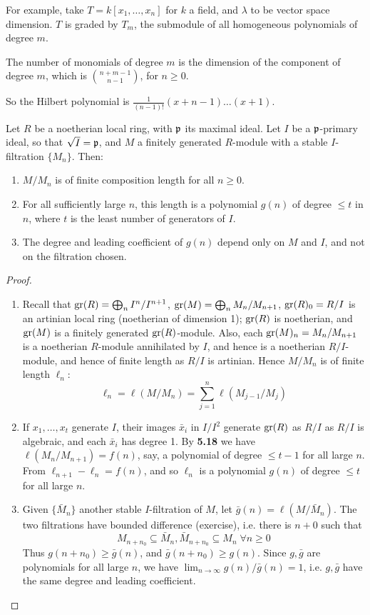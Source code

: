 \documentclass[10pt,a4paper]{article}
\begin{document}
For example, take $T = k[x_1,\ldots,x_n]$ for $k$ a field, and $\lambda$ to be vector space dimension. $T$ is graded by $T_m$, the submodule of all homogeneous polynomials of degree $m$.

The number of monomials of degree $m$ is the dimension of the component of degree $m$, which is $\binom{n+m-1}{n-1}$, for $n \geq 0$.

So the Hilbert polynomial is $\frac{1}{(n-1)!}(x+n-1)\ldots(x+1)$.
\begin{proposition}
  Let $R$ be a noetherian local ring, with $\mathfrak{p}$ its maximal ideal. Let $I$ be a $\mathfrak{p}$-primary ideal, so that $\sqrt{I} = \mathfrak{p}$, and $M$ a finitely generated $R$-module with a stable $I$-filtration $\{M_n\}$. Then:
  \begin{enumerate}
    \item $M/M_n$ is of finite composition length for all $n \geq 0$.
    \item For all sufficiently large $n$, this length is a polynomial $g(n)$ of degree $\leq t$ in $n$, where $t$ is the least number of generators of $I$.
    \item The degree and leading coefficient of $g(n)$ depend only on $M$ and $I$, and not on the filtration chosen.
  \end{enumerate}
\end{proposition}
\begin{proof}\hspace*{0cm}
  \begin{enumerate}
    \item Recall that $\operatorname{gr}(R) = \bigoplus_n I^n/I^{n+1}$, $\operatorname{gr}(M) = \bigoplus_n M_n/M_{n+1}$, $\operatorname{gr}(R)_0 = R/I$ is an artinian local ring (noetherian of dimension 1); $\operatorname{gr}(R)$ is noetherian, and $\operatorname{gr}(M)$ is a finitely generated $\operatorname{gr}(R)$-module. Also, each $\operatorname{gr}(M)_n = M_n/M_{n+1}$ is a noetherian $R$-module annihilated by $I$, and hence is a noetherian $R/I$-module, and hence of finite length as $R/I$ is artinian. Hence $M/M_n$ is of finite length $\ell_n$:
    \[\ell_n = \ell(M/M_n) = \sum_{j=1}^n \ell(M_{j-1}/M_j)\tag{$\ast$}\]
    \item If $x_1, \ldots, x_t$ generate $I$, their images $\bar{x}_i$ in $I/I^2$ generate $\operatorname{gr}(R)$ as $R/I$ as $R/I$ is algebraic, and each $\bar{x}_i$ has degree 1. By \textbf{5.18} we have $\ell(M_n/M_{n+1}) = f(n)$, say, a polynomial of degree $\leq t-1$ for all large $n$. From $\ell_{n+1}-\ell_n = f(n)$, and so $\ell_n$ is a polynomial $g(n)$ of degree $\leq t$ for all large $n$.
    \item Given $\{\bar{M}_n\}$ another stable $I$-filtration of $M$, let $\bar{g}(n) = \ell(M/\bar{M}_n)$. The two filtrations have bounded difference (exercise), i.e. there is $n+0$ such that
    \[M_{n+n_0} \subseteq \bar{M}_n, \bar{M}_{n+n_0} \subseteq M_n \; \forall n\geq 0\]
    Thus $g(n+n_0) \geq \bar{g}(n)$, and $\bar{g}(n+n_0) \geq g(n)$. Since $g, \bar{g}$ are polynomials for all large $n$, we have $\lim_{n\to\infty}g(n)/\bar{g}(n) = 1$, i.e. $g, \bar{g}$ have the same degree and leading coefficient.
  \end{enumerate}
\end{proof}
\end{document}

